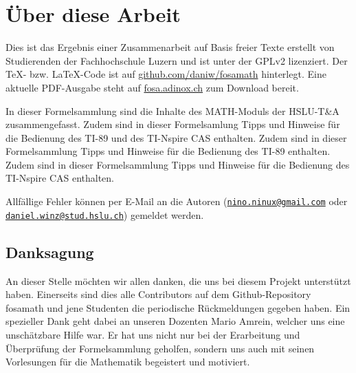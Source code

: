 



\chapter*{Über diese Arbeit}
Dies ist das Ergebnis einer Zusammenarbeit auf Basis freier Texte erstellt von 
Studierenden der Fachhochschule Luzern und ist unter der GPLv2 lizenziert. 
Der \TeX - bzw. \LaTeX -Code ist auf \url{github.com/daniw/fosamath} 
hinterlegt. Eine aktuelle PDF-Ausgabe steht auf \url{fosa.adinox.ch} zum 
Download bereit.

In dieser Formelsammlung sind die Inhalte des MATH-Moduls der HSLU-T\&A 
zusammengefasst.
%
\iftiboth
	Zudem sind in dieser Formelsamlung Tipps und Hinweise für die Bedienung 
    des TI-89 und des TI-Nspire CAS enthalten. 
	\else
	\ifti
		Zudem sind in dieser Formelsammlung Tipps und Hinweise für die 
        Bedienung des TI-89 enthalten. 
	\fi
	\ifnspire
		Zudem sind in dieser Formelsammlung Tipps und Hinweise für die 
        Bedienung des TI-Nspire CAS enthalten. 
	\fi
\fi

Allfällige Fehler können per E-Mail an die Autoren 
(\href{mailto:nino.ninux@gmail.com}{\nolinkurl{nino.ninux@gmail.com}} oder 
\href{mailto:daniel.winz@stud.hslu.ch}{\nolinkurl{daniel.winz@stud.hslu.ch}}) 
gemeldet werden. 

\section*{Danksagung}
An dieser Stelle möchten wir allen danken, die uns bei diesem Projekt 
unterstützt haben.
Einerseits sind dies alle Contributors auf dem Github-Repository fosamath und 
jene Studenten die periodische Rückmeldungen gegeben haben.
Ein spezieller Dank geht dabei an unseren Dozenten Mario Amrein, welcher uns 
eine unschätzbare Hilfe war.
Er hat uns nicht nur bei der Erarbeitung und Überprüfung der Formelsammlung 
geholfen, sondern uns auch mit seinen Vorlesungen für die Mathematik begeistert 
und motiviert.


